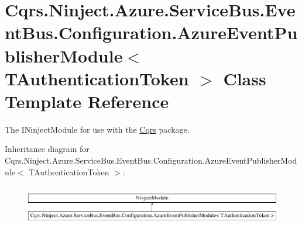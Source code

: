 \hypertarget{classCqrs_1_1Ninject_1_1Azure_1_1ServiceBus_1_1EventBus_1_1Configuration_1_1AzureEventPublisherModule}{}\section{Cqrs.\+Ninject.\+Azure.\+Service\+Bus.\+Event\+Bus.\+Configuration.\+Azure\+Event\+Publisher\+Module$<$ T\+Authentication\+Token $>$ Class Template Reference}
\label{classCqrs_1_1Ninject_1_1Azure_1_1ServiceBus_1_1EventBus_1_1Configuration_1_1AzureEventPublisherModule}


The I\+Ninject\+Module for use with the \hyperlink{namespaceCqrs}{Cqrs} package.  


Inheritance diagram for Cqrs.\+Ninject.\+Azure.\+Service\+Bus.\+Event\+Bus.\+Configuration.\+Azure\+Event\+Publisher\+Module$<$ T\+Authentication\+Token $>$\+:\begin{figure}[H]
\begin{center}
\leavevmode
\includegraphics[height=1.741835cm]{classCqrs_1_1Ninject_1_1Azure_1_1ServiceBus_1_1EventBus_1_1Configuration_1_1AzureEventPublisherModule}
\end{center}
\end{figure}
